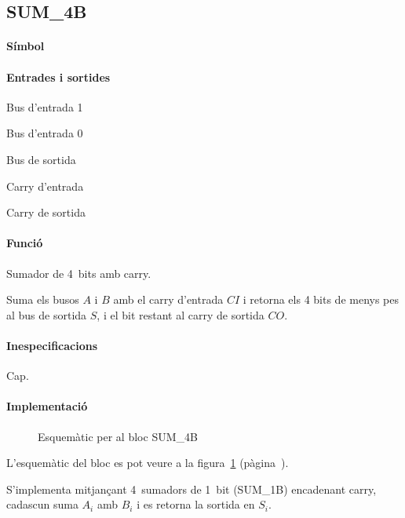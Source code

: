 \subsection{\label{sub:\projectname-SUM_4B} \textsf{SUM\_4B}}

\paragraph{Símbol}
\begin{center}  \end{center}

\paragraph{Entrades i sortides}

\begin{where}
\item[\nodenamerange{A}{3}{0}] Bus d'entrada 1
\item[\nodenamerange{B}{3}{0}] Bus d'entrada 0
\item[\nodenamerange{S}{3}{0}] Bus de sortida
\item[\nodenamebit{CI}] Carry d'entrada
\item[\nodenamebit{CO}] Carry de sortida
\end{where}

\paragraph{Funció}

Sumador de 4~bits amb carry.

Suma els busos $A$ i $B$ amb el carry d'entrada $CI$ i retorna els 4 bits de menys
pes al bus de sortida $S$, i el bit restant al carry de sortida $CO$.

\paragraph{Inespecificacions}

Cap.

\paragraph{Implementació}

\begin{figure}[b]
  \begin{center}
  \end{center}
  \caption{\label{fig:\projectname-SUM_4B} Esquemàtic per al bloc \textsf{SUM\_4B}}
\end{figure}

L'esquemàtic del bloc es pot veure a la figura~\ref{fig:\projectname-SUM_4B} (pàgina~\pageref{fig:\projectname-SUM_4B}).

S'implementa mitjançant 4~sumadors de 1~bit (\textsf{SUM\_1B}) encadenant carry,
cadascun suma $A_i$ amb $B_i$ i es retorna la sortida en $S_i$.

\vspace{1cm}
